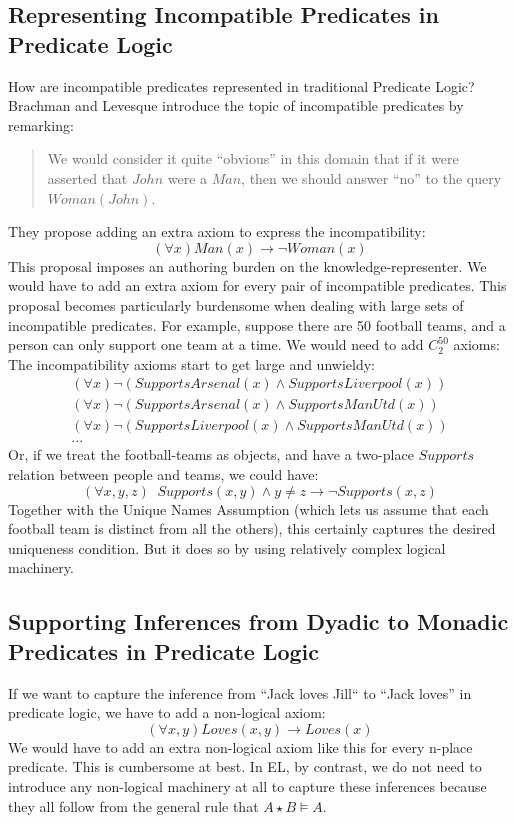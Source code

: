 \subsection{Representing Incompatible Predicates in Predicate Logic}
How are incompatible predicates represented in traditional Predicate Logic?
Brachman and Levesque\cite{brachman} introduce the topic of incompatible predicates by remarking:
\begin{quote}
We would consider it quite ``obvious'' in this domain that if it were asserted that $John$ were a $Man$, then we should answer ``no'' to the query $Woman(John)$.
\end{quote}
They propose adding an extra axiom to express the incompatibility:
\[
(\forall x) Man(x) \rightarrow \neg Woman(x)
\]   
This proposal imposes an authoring burden on the knowledge-representer.
We would have to add an extra axiom for every pair of incompatible predicates.
This proposal becomes particularly burdensome when dealing with large sets of incompatible predicates. 
For example, suppose there are 50 football teams, and a person can only support one team at a time. 
We would need to add $C^{50}_2$ axioms:
The incompatibility axioms start to get large and unwieldy:
\begin{eqnarray}
(\forall x) \neg (SupportsArsenal(x) \land SupportsLiverpool(x)) \nonumber \\
(\forall x) \neg (SupportsArsenal(x) \land SupportsManUtd(x)) \nonumber \\
(\forall x) \neg (SupportsLiverpool(x) \land SupportsManUtd(x)) \nonumber \\
... \nonumber
\end{eqnarray}   
Or, if we treat the football-teams as objects, and have a two-place $Supports$ relation between people and teams, we could have:
\[
(\forall x,y,z) \; \; Supports(x,y) \land y \neq z \rightarrow \neg Supports(x,z)
\]   
Together with the Unique Names Assumption (which lets us assume that each football team is distinct from all the others), this certainly captures the desired uniqueness condition.
But it does so by using relatively complex logical machinery.

\subsection{Supporting Inferences from Dyadic to Monadic Predicates in Predicate Logic}
If we want to capture the inference from ``Jack loves Jill`` to ``Jack loves'' in predicate logic, we have to add a non-logical axiom:
\[
(\forall x, y) Loves(x,y) \rightarrow Loves(x)
\]
We would have to add an extra non-logical axiom like this for every n-place predicate.
This is cumbersome at best. 
In EL, by contrast, we do not need to introduce any non-logical machinery at all to capture these inferences because they all follow from the general rule that $A \star B \models A$.

